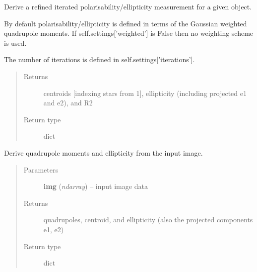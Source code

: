 \documentclass[a4paper,11pt,english]{sphinxmanual}
\begin{document}
\begin{fulllineitems}
\begin{fulllineitems}
\end{fulllineitems}


\begin{fulllineitems}
Derive a refined iterated polarisability/ellipticity measurement for a given object.

By default polarisability/ellipticity is defined in terms of the Gaussian weighted quadrupole moments.
If self.settings{[}'weighted'{]} is False then no weighting scheme is used.

The number of iterations is defined in self.settings{[}'iterations'{]}.
\begin{quote}\begin{description}
\item[{Returns}] \leavevmode
centroids {[}indexing stars from 1{]}, ellipticity (including projected e1 and e2), and R2

\item[{Return type}] \leavevmode
dict

\end{description}\end{quote}

\end{fulllineitems}


\begin{fulllineitems}
Derive quadrupole moments and ellipticity from the input image.
\begin{quote}\begin{description}
\item[{Parameters}] \leavevmode
\textbf{img} (\emph{ndarray}) -- input image data

\item[{Returns}] \leavevmode
quadrupoles, centroid, and ellipticity (also the projected components e1, e2)

\item[{Return type}] \leavevmode
dict

\end{description}\end{quote}

\end{fulllineitems}



\end{fulllineitems}
\end{document}
